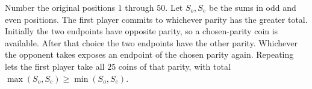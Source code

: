 Number the original positions $1$ through $50$. Let $S_o,S_e$ be the sums in odd and even positions. The first player commits to whichever parity has the greater total. Initially the two endpoints have opposite parity, so a chosen-parity coin is available. After that choice the two endpoints have the other parity. Whichever the opponent takes exposes an endpoint of the chosen parity again. Repeating lets the first player take all $25$ coins of that parity, with total $\max(S_o,S_e)\ge\min(S_o,S_e)$.
